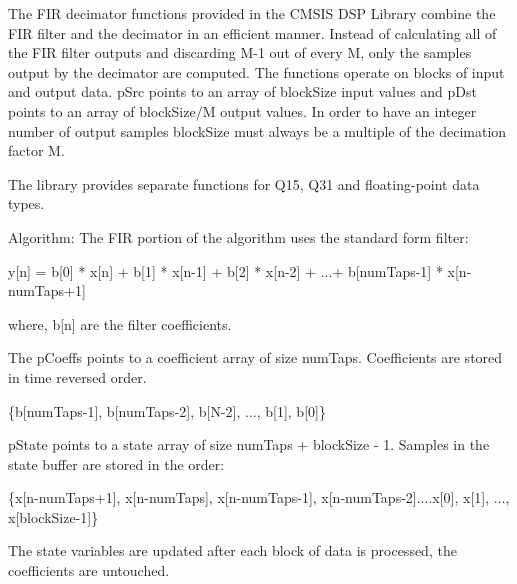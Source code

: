 The F\+IR decimator functions provided in the C\+M\+S\+IS D\+SP Library combine the F\+IR filter and the decimator in an efficient manner. Instead of calculating all of the F\+IR filter outputs and discarding {\ttfamily M-\/1} out of every {\ttfamily M}, only the samples output by the decimator are computed. The functions operate on blocks of input and output data. {\ttfamily p\+Src} points to an array of {\ttfamily block\+Size} input values and {\ttfamily p\+Dst} points to an array of {\ttfamily block\+Size/M} output values. In order to have an integer number of output samples {\ttfamily block\+Size} must always be a multiple of the decimation factor {\ttfamily M}.

The library provides separate functions for Q15, Q31 and floating-\/point data types.

\begin{DoxyParagraph}{Algorithm\+:}
The F\+IR portion of the algorithm uses the standard form filter\+: 
\begin{DoxyPre}
     y[n] = b[0] * x[n] + b[1] * x[n-1] + b[2] * x[n-2] + ...+ b[numTaps-1] * x[n-numTaps+1]
  \end{DoxyPre}
 where, {\ttfamily b\mbox{[}n\mbox{]}} are the filter coefficients. 
\end{DoxyParagraph}
\begin{DoxyParagraph}{}
The {\ttfamily p\+Coeffs} points to a coefficient array of size {\ttfamily num\+Taps}. Coefficients are stored in time reversed order. 
\end{DoxyParagraph}
\begin{DoxyParagraph}{}

\begin{DoxyPre}
     \{b[numTaps-1], b[numTaps-2], b[N-2], ..., b[1], b[0]\}
  \end{DoxyPre}
 
\end{DoxyParagraph}
\begin{DoxyParagraph}{}
{\ttfamily p\+State} points to a state array of size {\ttfamily num\+Taps + block\+Size -\/ 1}. Samples in the state buffer are stored in the order\+: 
\end{DoxyParagraph}
\begin{DoxyParagraph}{}

\begin{DoxyPre}
     \{x[n-numTaps+1], x[n-numTaps], x[n-numTaps-1], x[n-numTaps-2]....x[0], x[1], ..., x[blockSize-1]\}
  \end{DoxyPre}
 The state variables are updated after each block of data is processed, the coefficients are untouched.
\end{DoxyParagraph}
